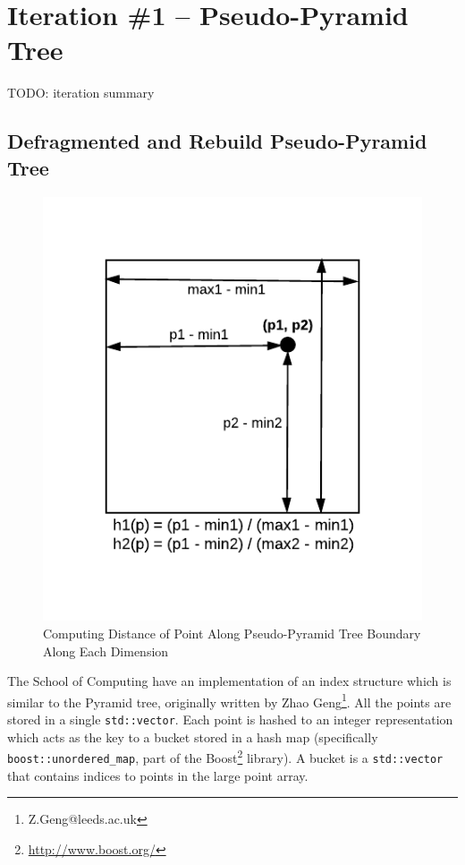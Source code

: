 \section{Iteration \#1 -- Pseudo-Pyramid Tree}

TODO: iteration summary

\subsection{Defragmented and Rebuild Pseudo-Pyramid Tree}

\begin{figure}
	\vspace{-40pt}
	\begin{center}
		\includegraphics[scale=0.6]{figures/pseudo-pyramid_tree_point_boundary_distances.pdf}
	\end{center}
	\vspace{-20pt}
	\caption{Computing Distance of Point Along Pseudo-Pyramid Tree Boundary Along Each Dimension}
	\label{fig:point-boundary-distance}
\end{figure}

The School of Computing have an implementation of an index structure which is similar to the Pyramid tree, originally written by Zhao Geng\footnote{Z.Geng@leeds.ac.uk}. All the points are stored in a single \texttt{std::vector}. Each point is hashed to an integer representation which acts as the key to a bucket stored in a hash map (specifically \texttt{boost::unordered\_map}, part of the Boost\footnote{\url{http://www.boost.org/}} library). A bucket is a \texttt{std::vector} that contains indices to points in the large point array.

